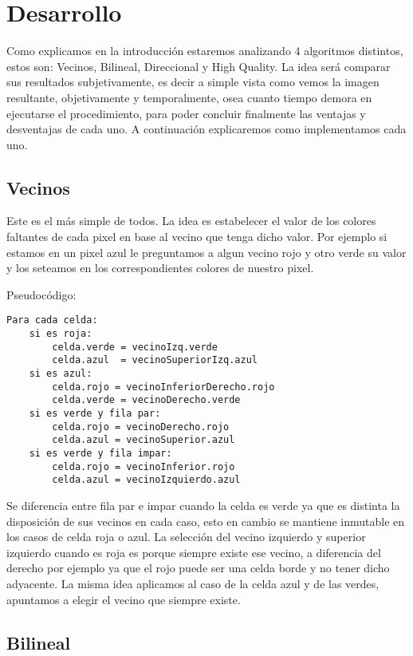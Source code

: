 \section{Desarrollo}

Como explicamos en la introducción estaremos analizando 4 algoritmos distintos, estos son: Vecinos, Bilineal, Direccional y High Quality. La idea será comparar sus resultados subjetivamente, es decir a simple vista como 
vemos la imagen resultante, objetivamente y temporalmente, osea cuanto tiempo demora en ejecutarse el procedimiento, para poder concluir finalmente las ventajas y desventajas de cada uno. A continuación explicaremos como 
implementamos cada uno.

\subsection{Vecinos}
Este es el más simple de todos. La idea es estabelecer el valor de los colores faltantes de cada pixel en base al vecino que tenga dicho valor. Por ejemplo si estamos en un pixel azul le preguntamos a algun vecino rojo y 
otro verde su valor y los seteamos en los correspondientes colores de nuestro pixel.

Pseudocódigo:
\begin{lstlisting}[frame=single] 
Para cada celda:
	si es roja:
		celda.verde = vecinoIzq.verde
		celda.azul  = vecinoSuperiorIzq.azul	
	si es azul:
		celda.rojo = vecinoInferiorDerecho.rojo
		celda.verde = vecinoDerecho.verde
	si es verde y fila par:
		celda.rojo = vecinoDerecho.rojo
		celda.azul = vecinoSuperior.azul
	si es verde y fila impar:
		celda.rojo = vecinoInferior.rojo
		celda.azul = vecinoIzquierdo.azul
\end{lstlisting}

Se diferencia entre fila par e impar cuando la celda es verde ya que es distinta la disposición de sus vecinos en cada caso, esto en cambio se mantiene inmutable en los casos de celda roja o azul. La selección del
vecino izquierdo y superior izquierdo cuando es roja es porque siempre existe ese vecino, a diferencia del derecho por ejemplo ya que el rojo puede ser una celda borde y no tener dicho adyacente. La misma idea aplicamos 
al caso de la celda azul y de las verdes, apuntamos a elegir el vecino que siempre existe.

\subsection{Bilineal}

